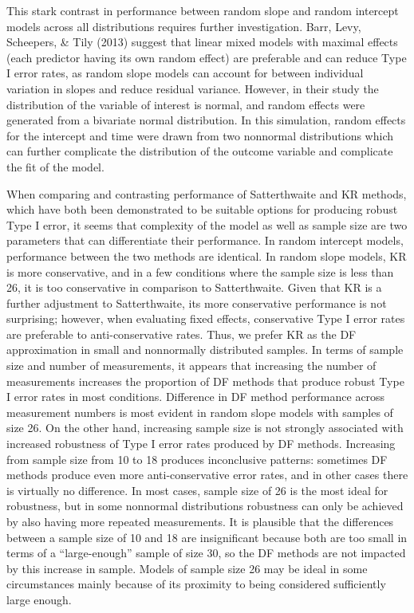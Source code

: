 \documentclass[12pt, twoside]{amherstthesis}
\begin{document}
This stark contrast in performance between random slope and random intercept models across all distributions requires further investigation. Barr, Levy, Scheepers, \& Tily (2013) suggest that linear mixed models with maximal effects (each predictor having its own random effect) are preferable and can reduce Type I error rates, as random slope models can account for between individual variation in slopes and reduce residual variance. However, in their study the distribution of the variable of interest is normal, and random effects were generated from a bivariate normal distribution. In this simulation, random effects for the intercept and time were drawn from two nonnormal distributions which can further complicate the distribution of the outcome variable and complicate the fit of the model.

When comparing and contrasting performance of Satterthwaite and KR methods, which have both been demonstrated to be suitable options for producing robust Type I error, it seems that complexity of the model as well as sample size are two parameters that can differentiate their performance. In random intercept models, performance between the two methods are identical. In random slope models, KR is more conservative, and in a few conditions where the sample size is less than 26, it is too conservative in comparison to Satterthwaite. Given that KR is a further adjustment to Satterthwaite, its more conservative performance is not surprising; however, when evaluating fixed effects, conservative Type I error rates are preferable to anti-conservative rates. Thus, we prefer KR as the DF approximation in small and nonnormally distributed samples.
In terms of sample size and number of measurements, it appears that increasing the number of measurements increases the proportion of DF methods that produce robust Type I error rates in most conditions. Difference in DF method performance across measurement numbers is most evident in random slope models with samples of size 26. On the other hand, increasing sample size is not strongly associated with increased robustness of Type I error rates produced by DF methods. Increasing from sample size from 10 to 18 produces inconclusive patterns: sometimes DF methods produce even more anti-conservative error rates, and in other cases there is virtually no difference. In most cases, sample size of 26 is the most ideal for robustness, but in some nonnormal distributions robustness can only be achieved by also having more repeated measurements. It is plausible that the differences between a sample size of 10 and 18 are insignificant because both are too small in terms of a ``large-enough'' sample of size 30, so the DF methods are not impacted by this increase in sample. Models of sample size 26 may be ideal in some circumstances mainly because of its proximity to being considered sufficiently large enough.
\end{document}
